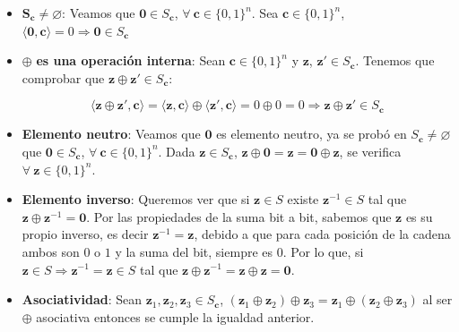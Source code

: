  \begin{itemize}
     \item $\mathbf{S_{\mathbf{c}} \neq \varnothing}$: Veamos que $\mathbf{0} \in S_{\mathbf{c}}$, $\forall\: \mathbf{c} \in \{0,1\}^{n}$. Sea $\mathbf{c} \in \{0,1\}^{n}$, $\langle\mathbf{0},\mathbf{c}\rangle=0 \Rightarrow \mathbf{0} \in S_{\mathbf{c}}$

     \item $\oplus$ \textbf{es una operación interna}: Sean $\mathbf{c} \in \{0,1\}^{n}$ y $\mathbf{z}$, $\mathbf{z}' \in S_{\mathbf{c}}$. Tenemos que comprobar que $\mathbf{z} \oplus\mathbf{z}' \in S_{\mathbf{c}}$:

     \begin{equation}
         \langle\mathbf{z} \oplus \mathbf{z}', \mathbf{c} \rangle = \langle\mathbf{z}, \mathbf{c} \rangle \oplus \langle \mathbf{z}', \mathbf{c} \rangle = 0\oplus0=0 \Rightarrow \mathbf{z} \oplus\mathbf{z}' \in S_{\mathbf{c}}
     \end{equation}
    
     \item \textbf{Elemento neutro}: Veamos que $\mathbf{0}$ es elemento neutro, ya se probó en $S_{\mathbf{c}} \neq \varnothing$ que $\mathbf{0} \in S_{\mathbf{c}}$, $ \forall \:\mathbf{c} \in \{0,1\}^{n}$. Dada $\mathbf{z} \in S_{\mathbf{c}}$, $\mathbf{z} \oplus \mathbf{0} = \mathbf{z} = \mathbf{0} \oplus \mathbf{z}$, se verifica $\forall \:\mathbf{z} \in \{0,1\}^{n}$.

     \item \textbf{Elemento inverso}: Queremos ver que si $\mathbf{z} \in S$ existe $\mathbf{z}^{-1} \in S$ tal que $\mathbf{z}\oplus\mathbf{z}^{-1}=\mathbf{0}$. Por las propiedades de la suma bit a bit, sabemos que $\mathbf{z}$ es su propio inverso, es decir $\mathbf{z}^{-1}=\mathbf{z}$, debido a que para cada posición de la cadena ambos son $0$ o $1$ y la suma del bit, siempre es $0$. Por lo que, si $\mathbf{z} \in S \Rightarrow \mathbf{z}^{-1} = \mathbf{z} \in S$ tal que $\mathbf{z}\oplus\mathbf{z}^{-1}=\mathbf{z}\oplus\mathbf{z}=\mathbf{0}$.

     \item \textbf{Asociatividad}: Sean $\mathbf{z}_{1}, \mathbf{z}_{2}, \mathbf{z}_{3} \in S_{\mathbf{c}}$, $(\mathbf{z}_{1}\oplus \mathbf{z}_{2}) \oplus \mathbf{z}_{3} = \mathbf{z}_{1} \oplus( \mathbf{z}_{2} \oplus \mathbf{z}_{3})$ al ser $\oplus$ asociativa entonces se cumple la igualdad anterior.
 \end{itemize}

